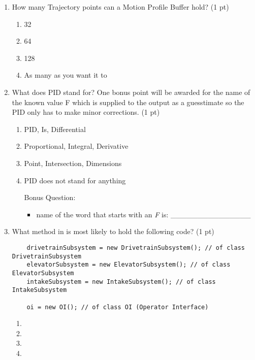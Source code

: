 \documentclass[11pt,fleqn]{article}
\begin{document}
\begin{enumerate}
\item How many Trajectory points can a Motion Profile Buffer hold? (1 pt)
	\begin{enumerate}
	\item 32
	\item 64
	\item 128
	\item As many as you want it to
	\end{enumerate}

\item What does PID stand for? One bonus point will be awarded for the name of the known value F which is supplied to the output as a guesstimate so the PID only has to make minor corrections. (1 pt)
	\begin{enumerate}
	\item PID, Is, Differential
	\item Proportional, Integral, Derivative
	\item Point, Intersection, Dimensions
	\item PID does not stand for anything

    \vspace{3ex}

	Bonus Question:
	\begin{itemize}
	    \item name of the word that starts with an \textit{F} is: \_\_\_\_\_\_\_\_\_\_\_\_\_\_\_
	\end{itemize}

	\end{enumerate}

    \vspace{6ex}

\item What method in  is most likely to hold the following code? (1 pt)
  \begin{verbatim}
    drivetrainSubsystem = new DrivetrainSubsystem(); // of class DrivetrainSubsystem
    elevatorSubsystem = new ElevatorSubsystem(); // of class ElevatorSubsystem
    intakeSubsystem = new IntakeSubsystem(); // of class IntakeSubsystem

    oi = new OI(); // of class OI (Operator Interface)
  \end{verbatim}

  \begin{enumerate}
    \item {}
    \item {}
    \item {}
    \item {}
  \end{enumerate}


\end{enumerate}
\end{document}
